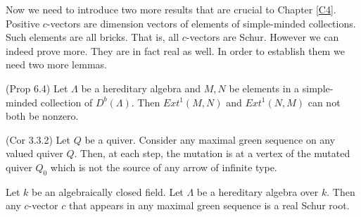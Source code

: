 \indent Now we need to introduce two more results that are crucial to Chapter \ref{C4}. Positive $c$-vectors are dimension vectors of elements of simple-minded collections. Such elements are all bricks. That is, all $c$-vectors are Schur. However we can indeed prove more. They are in fact real as well. In order to establish them we need two more lemmas.\\
\begin{lemma}
\cite{KQ15} (Prop 6.4)\label{KQ} Let $\Lambda$ be a hereditary algebra and $M,N$ be elements in a simple-minded collection of $D^b(\Lambda)$. Then $Ext^1(M,N)$ and $Ext^1(N,M)$ can not both be nonzero.
\end{lemma}
\begin{lemma}
\cite{BHIT15} (Cor 3.3.2) \label{BHIT} Let $Q$ be a quiver. Consider any maximal green sequence on any valued quiver $Q$. Then, at each step, the mutation is at a vertex of the mutated quiver $Q_0$ which is not the source of any arrow of infinite type.
\end{lemma}
\begin{lemma}
Let $k$ be an algebraically closed field. Let $\Lambda$ be a hereditary algebra over $k$. Then any $c$-vector $c$ that appears in any maximal green sequence is a real Schur root.
\end{lemma}
